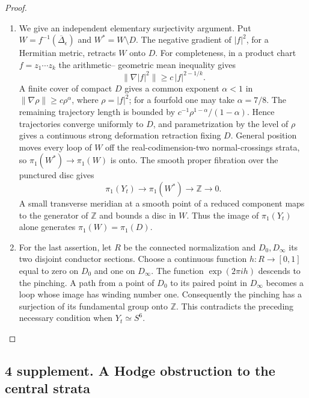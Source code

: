 \begin{proof}
\begin{enumerate}[label=\arabic*.,leftmargin=*]
\item We give an independent elementary
surjectivity argument. Put
$W=f^{-1}(\overline\Delta_\epsilon)$
and $W^*=W\setminus D$. The negative
gradient of $|f|^2$, for a Hermitian
metric, retracts $W$ onto $D$.
For completeness, in a product chart
$f=z_1\cdots z_k$ the arithmetic--
geometric mean inequality gives
\[
 \|\nabla |f|^2\|
   \ge c\,|f|^{2-1/k}.
\]
A finite cover of compact $D$ gives
a common exponent $\alpha<1$ in
$\|\nabla\rho\|\ge c\rho^\alpha$,
where $\rho=|f|^2$; for a fourfold
one may take $\alpha=7/8$.
The remaining trajectory length is
bounded by
$c^{-1}\rho^{1-\alpha}/(1-\alpha)$.
Hence trajectories converge uniformly
to $D$, and parametrization by the
level of $\rho$ gives a continuous
strong deformation retraction fixing
$D$. General position moves every
loop of $W$ off the real-codimension-two
normal-crossings strata, so
$\pi_1(W^*)\to\pi_1(W)$ is onto.
The smooth proper fibration over the
punctured disc gives
\[
 \pi_1(Y_t)\longrightarrow\pi_1(W^*)
       \longrightarrow\mathbb Z\longrightarrow0.
\]
A small transverse meridian at a
smooth point of a reduced component
maps to the generator of $\mathbb Z$
and bounds a disc in $W$.
Thus the image of $\pi_1(Y_t)$ alone
generates $\pi_1(W)=\pi_1(D)$.

\item For the last assertion, let $R$ be
the connected normalization and
$D_0,D_\infty$ its two disjoint
conductor sections. Choose a
continuous function $h:R\to[0,1]$
equal to zero on $D_0$ and one on
$D_\infty$. The function
$\exp(2\pi i h)$ descends to the
pinching. A path from a point of
$D_0$ to its paired point in
$D_\infty$ becomes a loop whose
image has winding number one.
Consequently the pinching has a
surjection of its fundamental group
onto $\mathbb Z$. This contradicts
the preceding necessary condition
when $Y_t\simeq S^6$.
\end{enumerate}
\end{proof}

\subsection{4 supplement. A Hodge obstruction to the central strata}

